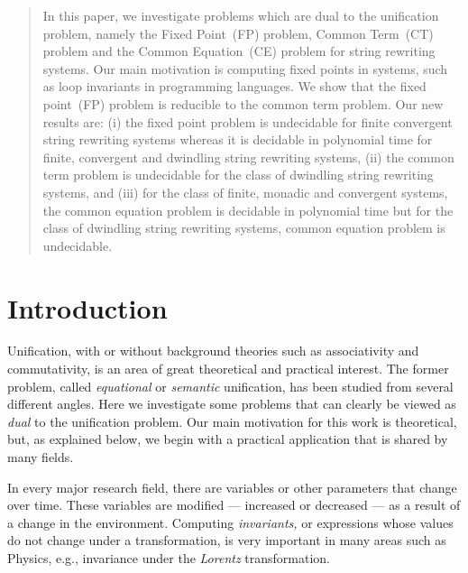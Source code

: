 \documentclass{lmcs} %
\theoremstyle{plain}\newtheorem{satz}[thm]{Satz} %
\begin{document}
\begin{abstract}
  \noindent In this paper, we investigate problems which are dual to the
  unification problem, namely the Fixed Point~(FP) problem, Common Term~(CT) problem and
  the Common Equation~(CE) problem for string rewriting
  systems. Our main motivation is computing fixed points in
  systems, such as loop invariants in programming languages. We
  show that the fixed point~(FP) problem is reducible to the common term
  problem. Our new results are:
  (i) the fixed point problem is undecidable for finite convergent
  string rewriting systems whereas it is decidable in polynomial time for finite, convergent and dwindling string rewriting systems,
  (ii) the common term problem is undecidable
  for the class of dwindling string rewriting systems, and
  (iii) for the
  class of finite, monadic and convergent systems, the common equation
  problem is decidable in polynomial time but for the class of dwindling string rewriting systems, common equation problem is undecidable.
\end{abstract}

\maketitle

\section*{Introduction}\label{S:one}

  Unification, with or without background theories such as
associativity and commutativity, is an area of great theoretical
and practical interest. The former problem, called \emph{equational}
or \emph{semantic} unification, has been studied from several different angles.
Here we investigate some problems that can clearly be viewed as \emph{dual}
to the unification problem.
Our main motivation for this work is theoretical, but, as explained below,
we begin with a practical application that is shared by
many fields.

In every major research field, there are variables or other parameters that change over
time. These variables are modified --- increased
or decreased --- as a
result of a change in the environment. 
Computing \emph{invariants,} or expressions whose values do not change
under a transformation, is very important in many areas 
such as Physics, e.g., invariance under the \emph{Lorentz} transformation.
\end{document}
